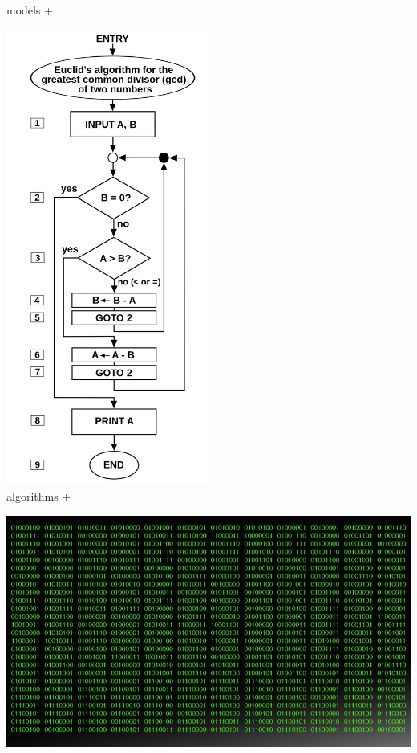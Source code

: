 \documentclass[12pt]{beamer}
\begin{document}
\begin{frame}
\begin{minipage}[b]{0.2\textwidth}
 models + 
\end{minipage} 
\begin{minipage}[b]{0.2\textwidth}
\centering
\includegraphics[width=0.5\textwidth]{Figures/algorithm.png} \\
\alert{algorithms} + 
\end{minipage} 
\begin{minipage}[b]{0.2\textwidth}
\centering
\includegraphics[width=\textwidth]{Figures/data.png} \\

\end{minipage}
\end{frame}
\end{document}
